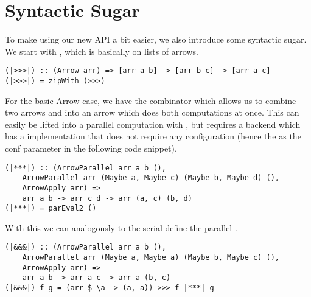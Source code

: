 \section{Syntactic Sugar}
To make using our new API a bit easier, we also introduce some syntactic sugar.
We start with \code{|>>>|}, which is basically \code{>>>} on lists of arrows.
\begin{lstlisting}[frame=htrbl]
(|>>>|) :: (Arrow arr) => [arr a b] -> [arr b c] -> [arr a c]
(|>>>|) = zipWith (>>>)
\end{lstlisting}
For the basic Arrow case, we have the \code{***} combinator which allows us to combine two arrows  and  into an arrow  which does both computations at once. This can easily be lifted into a parallel computation with , but requires a backend which has a implementation that does not require any configuration (hence the \code{()} as the conf parameter in the following code snippet).
\begin{lstlisting}[frame=htrbl]
(|***|) :: (ArrowParallel arr a b (),
	ArrowParallel arr (Maybe a, Maybe c) (Maybe b, Maybe d) (),
	ArrowApply arr) =>
	arr a b -> arr c d -> arr (a, c) (b, d)
(|***|) = parEval2 ()
\end{lstlisting}
With this we can analogously to the serial \code{&&&} define the parallel \code{|&&&|}.
\begin{lstlisting}[frame=htrbl]
(|&&&|) :: (ArrowParallel arr a b (),
	ArrowParallel arr (Maybe a, Maybe a) (Maybe b, Maybe c) (),
	ArrowApply arr) =>
	arr a b -> arr a c -> arr a (b, c)
(|&&&|) f g = (arr $ \a -> (a, a)) >>> f |***| g
\end{lstlisting}